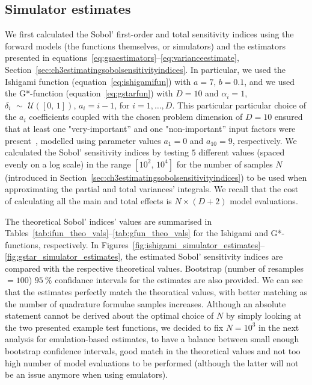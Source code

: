 \subsection{Simulator estimates}\label{sec:chAsimulator_estimates}
We first calculated the Sobol' first-order and total sensitivity indices using the forward models (the functions themselves, or simulators) and the estimators presented in equations~\eqref{eq:gsaestimators}--\eqref{eq:varianceestimate}, Section~\ref{sec:ch3estimatingsobolsensitivityindices}. In particular, we used the Ishigami function (equation~\eqref{eq:ishigamifun}) with $a=7,\,b=0.1$, and we used the G*-function (equation~\eqref{eq:gstarfun}) with $D=10$ and $\alpha_i=1$, $\delta_i\,\,\sim\,\,\mathcal{U}([0,\,1])$, $a_i=i-1$, for $i=1,\dots,D$. This particular particular choice of the $a_i$ coefficients coupled with the chosen problem dimension of $D=10$ ensured that at least one "very-important'' and one "non-important'' input factors were present~\cite{Saltelli:2010,Marrel:2008}, modelled using parameter values $a_1=0$ and $a_{10}=9$, respectively. We calculated the Sobol' sensitivity indices by testing $5$ different values (spaced evenly on a log scale) in the range $[10^2,\,10^4]$ for the number of samples $N$ (introduced in Section~\ref{sec:ch3estimatingsobolsensitivityindices}) to be used when approximating the partial and total variances' integrals. We recall that the cost of calculating all the main and total effects is $N\times(D+2)$ model evaluations.

\vspace{0.2cm}
The theoretical Sobol' indices' values are summarised in Tables~\ref{tab:ifun_theo_vals}--\ref{tab:gfun_theo_vals} for the Ishigami and G*- functions, respectively. In Figures~\ref{fig:ishigami_simulator_estimates}--\ref{fig:gstar_simulator_estimates}, the estimated Sobol' sensitivity indices are compared with the respective theoretical values. Bootstrap (number of resamples $=100$) $\SI{95}{\percent}$ confidance intervals for the estimates are also provided. We can see that the estimates perfectly match the theoratical values, with better matching as the number of quadrature formulae samples increases. Although an absolute statement cannot be derived about the optimal choice of $N$ by simply looking at the two presented example test functions, we decided to fix $N=10^3$ in the next analysis for emulation-based estimates, to have a balance between small enough bootstrap confidence intervals, good match in the theoretical values and not too high number of model evaluations to be performed (although the latter will not be an issue anymore when using emulators).

